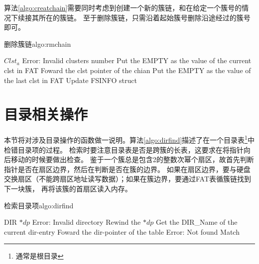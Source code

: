 算法\ref{algo:creatchain}需要同时考虑到创建一个新的簇链，和在给定一个簇号的情况下续接其所在的簇链。
至于删除簇链，只需沿着起始簇号删除沿途经过的簇号即可。
\begin{balgo}{删除簇链}{algo:rmchain}
\begin{algorithmic}[1]
\Require $Clst_a$
    \State \Return Error: Invalid clusters number
\Else
    \Repeat
    \State Put the EMPTY as the value of the current clst in FAT
    \State Foward the clst pointer of the chian
    \State Put the EMPTY as the value of the last clst in FAT
    \State Update FSINFO struct
\EndIf
\end{algorithmic}
\end{balgo}

\section{目录相关操作}
\label{sec:dirfunc}

本节将对涉及目录操作的函数做一说明。算法\ref{algo:dirfind}描述了在一个目录表\footnote{通常是根目录}中检错目录项的过程。
检索时要注意目录表是否是跨簇的长表，这要求在将指针向后移动的时候要做出检查。
鉴于一个簇总是包含2的整数次幂个扇区，故首先判断指针是否在扇区边界，然后在判断是否在簇的边界。
如果在扇区边界，要与硬盘交换扇区（不能跨扇区地址读写数据）；如果在簇边界，要通过FAT表循簇链找到下一块簇，
再将该簇的首扇区读入内存。
\begin{balgo}{检索目录项}{algo:dirfind}
\begin{algorithmic}[1]
\Require DIR $*dp$
    \State \Return Error: Invalid directory
\Else
    \State Rewind the $*dp$ 
    \Repeat
    \State Get the DIR\_Name of the current dir-entry
    \State Foward the dir-pointer of the table
        \State \Return Error: Not found
    \Else
        \State \Return Match
    \EndIf
\EndIf
\end{algorithmic}
\end{balgo}

